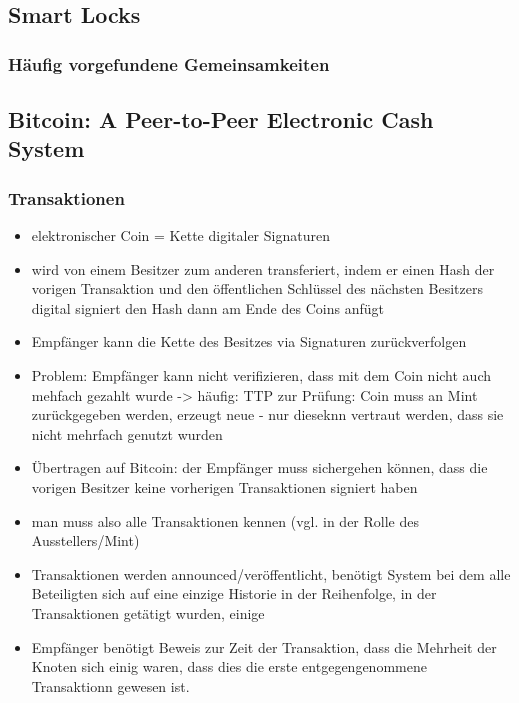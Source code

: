 \subsection{Smart Locks}
    \subsubsection{Häufig vorgefundene Gemeinsamkeiten}


\subsection*{Bitcoin: A Peer-to-Peer Electronic Cash System}\cite{Nakamoto2008}

\subsubsection*{Transaktionen}
    \begin{itemize}
        \item elektronischer Coin = Kette digitaler Signaturen
        \item wird von einem Besitzer zum anderen transferiert, indem er einen Hash der vorigen Transaktion und den öffentlichen Schlüssel des nächsten Besitzers digital signiert den Hash dann am Ende des Coins anfügt
        \item Empfänger kann die Kette des Besitzes via Signaturen zurückverfolgen
        \item Problem: Empfänger kann nicht verifizieren, dass mit dem Coin nicht auch mehfach gezahlt wurde -> häufig: TTP zur Prüfung: Coin muss an Mint zurückgegeben werden, erzeugt neue - nur dieseknn vertraut werden, dass sie nicht mehrfach genutzt wurden
        \item Übertragen auf Bitcoin: der Empfänger muss sichergehen können, dass die vorigen Besitzer keine vorherigen Transaktionen signiert haben
        \item man muss also alle Transaktionen kennen (vgl. in der Rolle des Ausstellers/Mint)
        \item Transaktionen werden announced/veröffentlicht, benötigt System bei dem alle Beteiligten sich auf eine einzige Historie in der Reihenfolge, in der Transaktionen getätigt wurden, einige
        \item Empfänger benötigt Beweis zur Zeit der Transaktion, dass die Mehrheit der Knoten sich einig waren, dass dies die erste entgegengenommene Transaktionn gewesen ist.
    \end{itemize}
